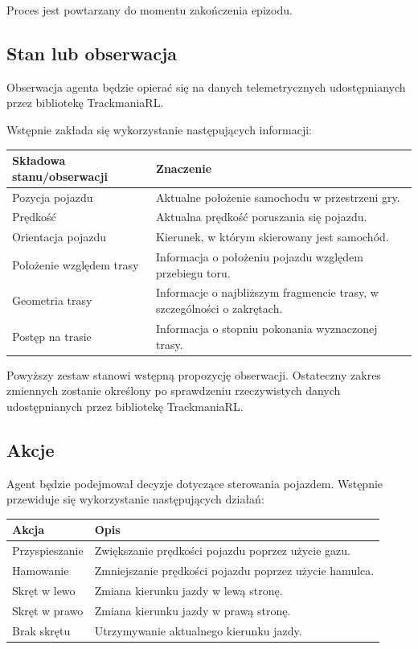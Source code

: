 \documentclass[12pt]{article}
\begin{document}
Proces jest powtarzany do momentu zakończenia epizodu.

\subsection{Stan lub obserwacja}

Obserwacja agenta będzie opierać się na danych telemetrycznych udostępnianych przez bibliotekę TrackmaniaRL.

Wstępnie zakłada się wykorzystanie następujących informacji:

\begin{center}
\begin{tabular}{p{}p{}}
\toprule
Składowa stanu/obserwacji & Znaczenie \\
\midrule
Pozycja pojazdu & Aktualne położenie samochodu w przestrzeni gry. \\
Prędkość & Aktualna prędkość poruszania się pojazdu. \\
Orientacja pojazdu & Kierunek, w którym skierowany jest samochód. \\
Położenie względem trasy & Informacja o położeniu pojazdu względem przebiegu toru. \\
Geometria trasy & Informacje o najbliższym fragmencie trasy, w szczególności o zakrętach. \\
Postęp na trasie & Informacja o stopniu pokonania wyznaczonej trasy. \\
\bottomrule
\end{tabular}
\end{center}

Powyższy zestaw stanowi wstępną propozycję obserwacji. Ostateczny zakres zmiennych zostanie określony po sprawdzeniu rzeczywistych danych udostępnianych przez bibliotekę TrackmaniaRL.

\subsection{Akcje}

Agent będzie podejmował decyzje dotyczące sterowania pojazdem. Wstępnie przewiduje się wykorzystanie następujących działań:

\begin{center}
\begin{tabular}{p{}p{}}
\toprule
Akcja & Opis \\
\midrule
Przyspieszanie & Zwiększanie prędkości pojazdu poprzez użycie gazu. \\
Hamowanie & Zmniejszanie prędkości pojazdu poprzez użycie hamulca. \\
Skręt w lewo & Zmiana kierunku jazdy w lewą stronę. \\
Skręt w prawo & Zmiana kierunku jazdy w prawą stronę. \\
Brak skrętu & Utrzymywanie aktualnego kierunku jazdy. \\
\bottomrule
\end{tabular}
\end{center}
\end{document}
